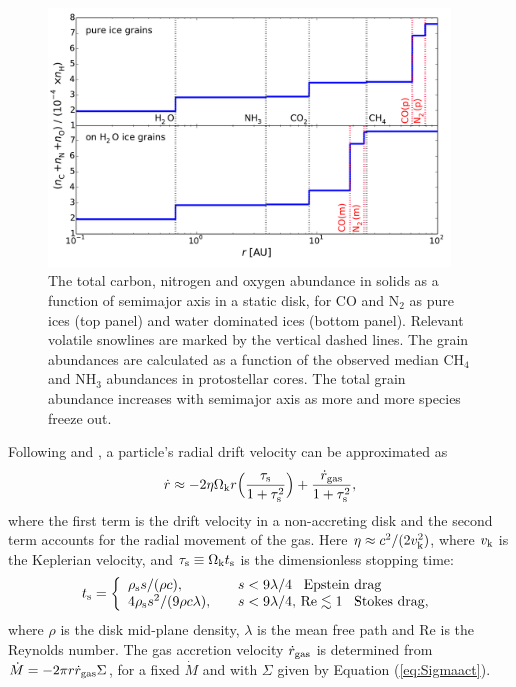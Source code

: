 \documentclass[apj]{emulateapj}
\begin{document}
\begin{figure}[t!]
\centering
\includegraphics[width=0.95\textwidth]{CNO_and_snowlines_2.pdf}
\caption{The total carbon, nitrogen and oxygen abundance in solids as a function of semimajor axis in a static disk, for CO and N$_2$ as pure ices (top panel) and water dominated ices (bottom panel). Relevant volatile snowlines are marked by the vertical dashed lines. The grain abundances are calculated as a function of the observed median CH$_4$ and NH$_3$ abundances in protostellar cores. The total grain abundance increases with semimajor axis as more and more species freeze out.} 
\label{fig:CNOstatic}
\end{figure}

Following \citet{chiang10} and \citet{birnstiel12}, a particle's radial drift velocity can be approximated as 
\begin{equation}
\label{eq:rdotact}
\dot{r} \approx -2 \eta \Omega_{\rm k} r \Big(\frac{\tau_{\rm s}}{1+\tau_{\rm s}^2}\Big) + \frac{\dot{r}_{\rm gas}}{1+\tau_{\rm s}^2},
\end{equation}
where the first term is the drift velocity in a non-accreting disk and the second term accounts for the radial movement of the gas. Here $\eta \approx c^2/(2 v_{\rm k}^2)$, where $v_{\rm k}$ is the Keplerian velocity, and $\tau_{\rm s} \equiv \Omega_{\rm k} t_{\rm s}$ is the dimensionless stopping time:
\begin{equation}
\label{eq:ts}
t_{\rm s}= \left\{
\begin{array}{l l}
\rho_{\rm s} s / (\rho c), & \quad s < 9 \lambda/4 \,\,\,\ \text{Epstein drag} \\
4 \rho_{\rm s} s^2 / (9 \rho c \lambda), & \quad s < 9 \lambda/4, \,\text{Re} \lesssim 1 \,\,\,\ \text{Stokes drag,}
\end{array} 
\right.
\end{equation}
where $\rho$ is the disk mid-plane density, $\lambda$ is the mean free path and Re is the Reynolds number.  The gas accretion velocity $\dot{r}_{\rm gas}$ is determined from $\dot{M}=-2 \pi r \dot{r}_{\rm gas} \Sigma$, for a fixed $\dot{M}$ and with $\Sigma$ given by Equation (\ref{eq:Sigmaact}). 
\end{document}
